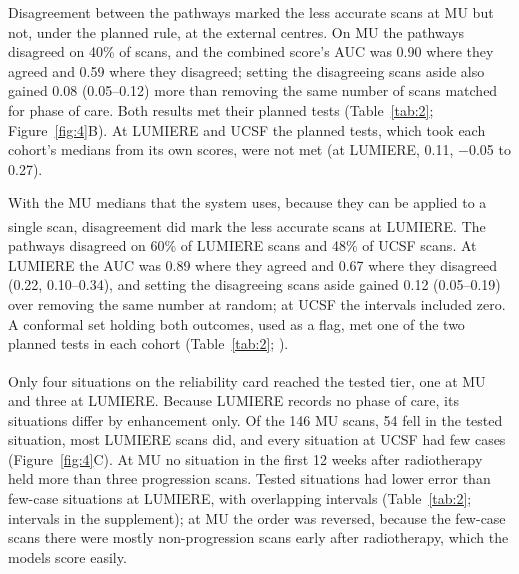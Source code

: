 \documentclass[largeformat]{interact} %
\newcommand{\expl}{\textsuperscript{\textdagger}}
\begin{document}
Disagreement between the pathways marked the less accurate scans at MU but not, under the planned rule, at the
external centres. On MU the pathways disagreed on 40\% of scans, and the combined score's AUC was 0.90 where they
agreed and 0.59 where they disagreed; setting the disagreeing scans aside also gained 0.08 (0.05--0.12) more than
removing the same number of scans matched for phase of care. Both results met their planned tests (Table~\ref{tab:2};
Figure~\ref{fig:4}B). At LUMIERE and UCSF the planned tests, which took each cohort's medians from its own scores,
were not met (at LUMIERE, 0.11, $-$0.05 to 0.27).

With the MU medians that the system uses, because they can be applied to a single scan, disagreement did mark the
less accurate scans at LUMIERE\expl. The pathways disagreed on 60\% of LUMIERE scans and 48\% of UCSF scans. At LUMIERE the AUC was 0.89
where they agreed and 0.67 where they disagreed (0.22, 0.10--0.34), and setting the disagreeing scans aside gained
0.12 (0.05--0.19) over removing the same number at random; at UCSF the intervals included zero. A conformal set holding both outcomes,
used as a flag, met one of the two planned tests in each cohort (Table~\ref{tab:2}; ).

Only four situations on the reliability card\expl{} reached the tested tier, one at MU and three at LUMIERE. Because LUMIERE
records no phase of care, its situations differ by enhancement only. Of the 146 MU scans, 54 fell in the tested
situation, most LUMIERE scans did, and every situation at UCSF had few cases (Figure~\ref{fig:4}C). At MU no situation in the first 12 weeks after radiotherapy held more than three progression
scans. Tested situations had lower error than few-case situations at LUMIERE, with overlapping intervals
(Table~\ref{tab:2}; intervals in the supplement); at MU the order was reversed, because the few-case scans there were mostly non-progression scans
early after radiotherapy, which the models score easily. 
\end{document}
